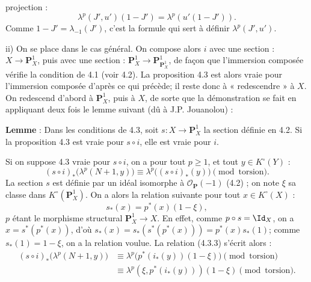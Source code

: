 projection :
\[
  \lambda^p(J',u')(1-J')=\lambda^p(u'(1-J')).
\]
Comme \(1-J'=\lambda_{-1}(J')\), c'est la formule qui sert à définir \(\lambda^p(J',u')\).

ii) On se place dans le cas général. On compose alors \(i\) avec une section : \(X\to\mathbf P_X^1\), puis avec une section : \(\mathbf P_X^1\to\mathbf P_{\mathbf P_X^1}^1\), de façon que l'immersion composée vérifie la condition de 4.1 (voir 4.2). La proposition 4.3 est alors vraie pour l'immersion composée d'après ce qui précède; il reste donc à « redescendre » à \(X\). On redescend d'abord à \(\mathbf P_X^1\), puis à \(X\), de sorte que la démonstration se fait en appliquant deux fois le lemme suivant (dû à J.P. Jouanolou) :

\textbf{Lemme} : Dans les conditions de 4.3, soit \(s:X\to\mathbf P_X^1\) la section définie en 4.2. Si la proposition 4.3 est vraie pour \(s\circ i\), elle est vraie pour \(i\).

Si on suppose 4.3 vraie pour \(s\circ i\), on a pour tout \(p\ge1\), et tout \(y\in K^\circ(Y)\) :
\begin{equation}\tag{4.3.3}
 (s\circ i)_*\bigl(\lambda^p(N+1,y)\bigr)
 \equiv
 \lambda^p\bigl((s\circ i)_*(y)\bigr)
 \pmod{\text{torsion}}.
\end{equation}
La section \(s\) est définie par un idéal isomorphe à \(\mathcal O_{\mathbf P}(-1)\) (4.2) ; on note \(\xi\) sa classe dans \(K^\circ(\mathbf P_X^1)\). On a alors la relation suivante pour tout \(x\in K^\circ(X)\) :
\[
  s_*(x)=p^*(x)(1-\xi),
\]
\(p\) étant le morphisme structural \(\mathbf P_X^1\to X\). En effet, comme \(p\circ s=\Id_X\), on a \(x=s^*(p^*(x))\), d'où \(s_*(x)=s_*(s^*(p^*(x)))=p^*(x)s_*(1)\); comme \(s_*(1)=1-\xi\), on a la relation voulue. La relation (4.3.3) s'écrit alors :
\[
\begin{aligned}
(s\circ i)_*\bigl(\lambda^p(N+1,y)\bigr)
&\equiv \lambda^p\bigl(p^*(i_*(y))(1-\xi)\bigr)\pmod{\text{torsion}}\\
&\equiv \lambda^p(\xi,p^*(i_*(y)))(1-\xi)\pmod{\text{torsion}}.
\end{aligned}
\]
